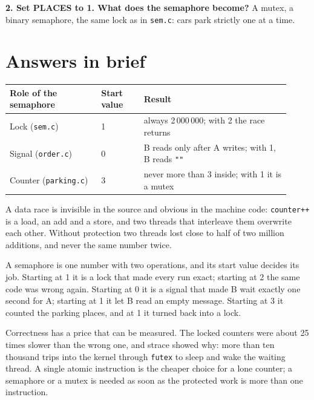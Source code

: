 \documentclass{assets/utmreport}
\begin{document}
\textbf{2. Set PLACES to 1. What does the semaphore become?}
A mutex, a binary semaphore, the same lock as in \texttt{sem.c}: cars park strictly one at a time.

\section*{Answers in brief}
\begin{tabular}{@{}p{0.30\linewidth}p{0.14\linewidth}p{0.48\linewidth}@{}}
\toprule
Role of the semaphore & Start value & Result \\
\midrule
Lock (\texttt{sem.c}) & 1 & always 2\,000\,000; with 2 the race returns \\
Signal (\texttt{order.c}) & 0 & B reads only after A writes; with 1, B reads \texttt{""} \\
Counter (\texttt{parking.c}) & 3 & never more than 3 inside; with 1 it is a mutex \\
\bottomrule
\end{tabular}

\utmconclusions
A data race is invisible in the source and obvious in the machine code: \texttt{counter++} is a load, an add and a store, and two threads that interleave them overwrite each other. Without protection two threads lost close to half of two million additions, and never the same number twice.

A semaphore is one number with two operations, and its start value decides its job. Starting at 1 it is a lock that made every run exact; starting at 2 the same code was wrong again. Starting at 0 it is a signal that made B wait exactly one second for A; starting at 1 it let B read an empty message. Starting at 3 it counted the parking places, and at 1 it turned back into a lock.

Correctness has a price that can be measured. The locked counters were about 25 times slower than the wrong one, and strace showed why: more than ten thousand trips into the kernel through \texttt{futex} to sleep and wake the waiting thread. A single atomic instruction is the cheaper choice for a lone counter; a semaphore or a mutex is needed as soon as the protected work is more than one instruction.
\end{document}
